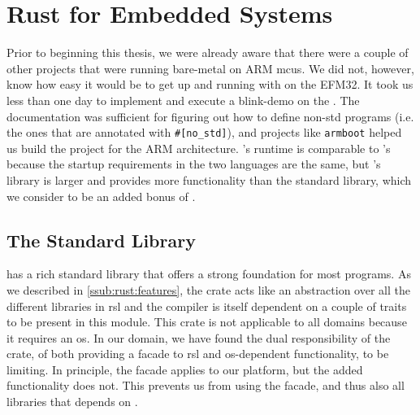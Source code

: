 
\section{Rust for Embedded Systems} %
\label{sec:disc:rust_for_arm}

Prior to beginning this thesis, we were already aware that there were a couple of other projects that were running {\rust} bare-metal on ARM \glspl{mcu}.
We did not, however, know how easy it would be to get up and running with {\rust} on the EFM32.
It took us less than one day to implement and execute a {\rust} blink-demo on the {\STK}.
The {\rust} documentation was sufficient for figuring out how to define non-std {\rust} programs (i.e. the ones that are annotated with \texttt{\#[no\_std]}), and projects like \texttt{armboot} helped us build the project for the ARM architecture.
{\rust}'s runtime is comparable to {\C}'s because the startup requirements in the two languages are the same, but {\rust}'s {\core} library is larger and provides more functionality than the {\C} standard library, which we consider to be an added bonus of {\rust}.

\subsection{The Standard Library} %
\label{sub:using_the_standard_library}

{\rust} has a rich standard library that offers a strong foundation for most {\rust} programs.
As we described in \autoref{ssub:rust:features}, the {\std} crate acts like an abstraction over all the different libraries in \gls{rsl} and the {\rustc} compiler is itself dependent on a couple of traits to be present in this module.
This crate is not applicable to all domains because it requires an \gls{os}.
In our domain, we have found the dual responsibility of the {\std} crate, of both providing a facade to \gls{rsl} and \gls{os}-dependent functionality, to be limiting.
In principle, the facade applies to our platform, but the added functionality does not.
This prevents us from using the facade, and thus also all libraries that depends on {\std}.

